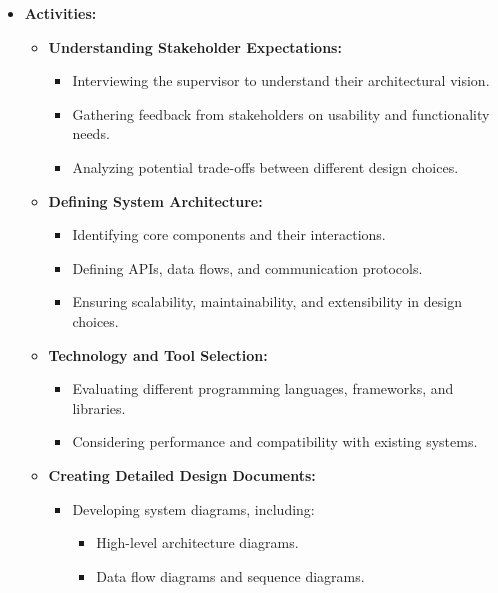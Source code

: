 \documentclass{article}
\begin{document}
\begin{itemize}[leftmargin=*, label={}]
    \item \textbf{Activities:}
        \begin{itemize}
            \item \textbf{Understanding Stakeholder Expectations:}
                \begin{itemize}
                    \item Interviewing the supervisor to understand their architectural vision.
                    \item Gathering feedback from stakeholders on usability and functionality needs.
                    \item Analyzing potential trade-offs between different design choices.
                \end{itemize}
            \item \textbf{Defining System Architecture:}
                \begin{itemize}
                    \item Identifying core components and their interactions.
                    \item Defining APIs, data flows, and communication protocols.
                    \item Ensuring scalability, maintainability, and extensibility in design choices.
                \end{itemize}
            \item \textbf{Technology and Tool Selection:}
                \begin{itemize}
                    \item Evaluating different programming languages, frameworks, and libraries.
                    \item Considering performance and compatibility with existing systems.
                \end{itemize}
            \item \textbf{Creating Detailed Design Documents:}
                \begin{itemize}
                    \item Developing system diagrams, including:
                        \begin{itemize}
                            \item High-level architecture diagrams.
                            \item Data flow diagrams and sequence diagrams.
                        \end{itemize}

\end{itemize}
\end{itemize}
\end{itemize}
\end{document}
